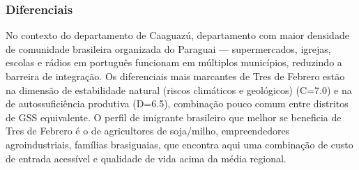 \subsubsection*{Diferenciais}\label{dif-tres-de-febrero-0518}
No contexto do departamento de Caaguazú, departamento com maior densidade de comunidade brasileira organizada do Paraguai — supermercados, igrejas, escolas e rádios em português funcionam em múltiplos municípios, reduzindo a barreira de integração. Os diferenciais mais marcantes de Tres de Febrero estão na dimensão de estabilidade natural (riscos climáticos e geológicos) (C=7.0) e na de autossuficiência produtiva (D=6.5), combinação pouco comum entre distritos de GSS equivalente. O perfil de imigrante brasileiro que melhor se beneficia de Tres de Febrero é o de agricultores de soja/milho, empreendedores agroindustriais, famílias brasiguaias, que encontra aqui uma combinação de custo de entrada acessível e qualidade de vida acima da média regional.
